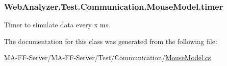 \subsubsection[{timer}]{ Web\+Analyzer.\+Test.\+Communication.\+Mouse\+Model.\+timer\hspace{0.3cm}{\ttfamily [private]}}\label{class_web_analyzer_1_1_test_1_1_communication_1_1_mouse_model_a23daaf5b022d16c45c6f9d0084da2819}


Timer to simulate data every x ms. 



The documentation for this class was generated from the following file\+:\begin{DoxyCompactItemize}
\item 
M\+A-\/\+F\+F-\/\+Server/\+M\+A-\/\+F\+F-\/\+Server/\+Test/\+Communication/\hyperlink{_mouse_model_8cs}{Mouse\+Model.\+cs}\end{DoxyCompactItemize}
